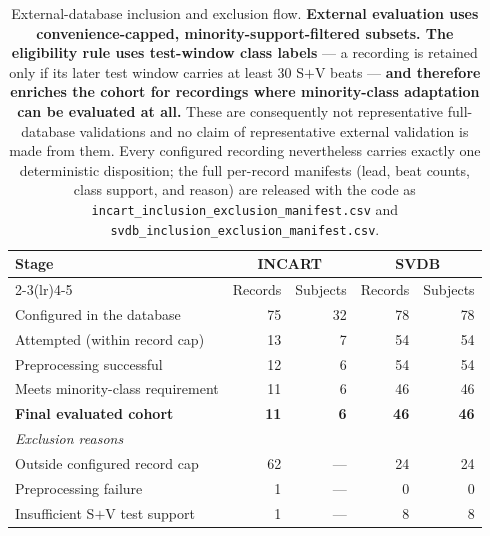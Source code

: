 \begin{table}[H]
\centering
\small
\caption{External-database inclusion and exclusion flow. \textbf{External
evaluation uses convenience-capped, minority-support-filtered subsets. The
eligibility rule uses test-window class labels} --- a recording is retained only
if its later test window carries at least 30 S$+$V beats --- \textbf{and
therefore enriches the cohort for recordings where minority-class adaptation can
be evaluated at all.} These are consequently not representative full-database
validations and no claim of representative external validation is made from them.
Every configured recording nevertheless carries exactly one deterministic
disposition; the full per-record manifests (lead, beat counts, class support, and
reason) are released with the code as
\texttt{incart\_inclusion\_exclusion\_manifest.csv} and
\texttt{svdb\_inclusion\_exclusion\_manifest.csv}.}
\label{tab:external_manifest}
\begin{tabular}{lrrrr}
\toprule
Stage & \multicolumn{2}{c}{INCART} & \multicolumn{2}{c}{SVDB} \\
\cmidrule(lr){2-3}\cmidrule(lr){4-5}
 & Records & Subjects & Records & Subjects \\
\midrule
Configured in the database        & 75 & 32 & 78 & 78 \\
Attempted (within record cap)     & 13 & 7  & 54 & 54 \\
Preprocessing successful          & 12 & 6  & 54 & 54 \\
Meets minority-class requirement  & 11 & 6  & 46 & 46 \\
\textbf{Final evaluated cohort}   & \textbf{11} & \textbf{6} & \textbf{46} & \textbf{46} \\
\midrule
\multicolumn{5}{l}{\emph{Exclusion reasons}} \\
Outside configured record cap     & 62 & --- & 24 & 24 \\
Preprocessing failure             &  1 & --- &  0 & 0 \\
Insufficient S$+$V test support   &  1 & --- &  8 & 8 \\
\bottomrule
\end{tabular}
\end{table}

